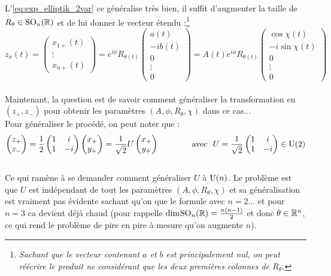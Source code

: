 L'\cref{eq:exp_elliptik_2var} ce généralise  très bien, il suffit d'augmenter la taille de $R_\theta\in\text{\normalfont SO}_n(\mathbb{R})$ et de lui donner le vecteur étendu :\footnote{\textit{Sachant que le vecteur contenant $a$ et $b$ est principalement nul, on peut réécrire le produit ne considérant que les deux premières colonnes de $R_\theta$.}}
\[z_x(t) = \begin{pmatrix}x_{1+}(t) \\ \vdots \\ 
	x_{n+}(t)\end{pmatrix} = e^{i\phi} R_{\theta(t)}\begin{pmatrix} a(t) \\ -ib(t) \\ 0 \\ \vdots \\ 0 \end{pmatrix} = A(t)e^{i\phi} R_{\theta(t)} \begin{pmatrix} \cos\chi(t) \\ -i\sin\chi(t) \\ 0 \\ \vdots \\ 0 \end{pmatrix}\]
\\

Maintenant, la question est de savoir comment généraliser la transformation en $(z_+, z_-)$ pour obtenir les paramètres $(A, \phi, R_\theta, \chi)$ dans ce cas...
\\
Pour généraliser le procédé, on peut noter que :
\[\begin{pmatrix}z_+ \\ z_-\end{pmatrix} = \frac{1}{2}\begin{pmatrix}1 & i \\ 1 & -i\end{pmatrix} \begin{pmatrix}x_+ \\ y_+\end{pmatrix} = \frac{1}{\sqrt{2}}U \begin{pmatrix}x_+ \\ y_+\end{pmatrix}\qquad\qquad \text{avec }\ U=\frac{1}{\sqrt{2}}\begin{pmatrix}1 & i \\ 1 & -i\end{pmatrix}\in\U{2}\]
\\ 
Ce qui ramène à se demander comment généraliser $U$ à $\text{\normalfont U}(n)$. Le problème est que $U$ est indépendant de tout les paramètres $(A, \phi, R_\theta, \chi)$ et sa généralisation est vraiment pas évidente sachant qu'on que le formule avec $n=2$... et pour $n=3$ ca devient déjà chaud (pour rappelle $\text{\normalfont dim}_{} \text{\normalfont SO}_n(\mathbb{R})=\frac{n(n-1)}{2}$ et donc $\theta\in\mathbb{R}^n$, ce qui rend le problème de pire en pire à mesure qu'on augmente $n$).



